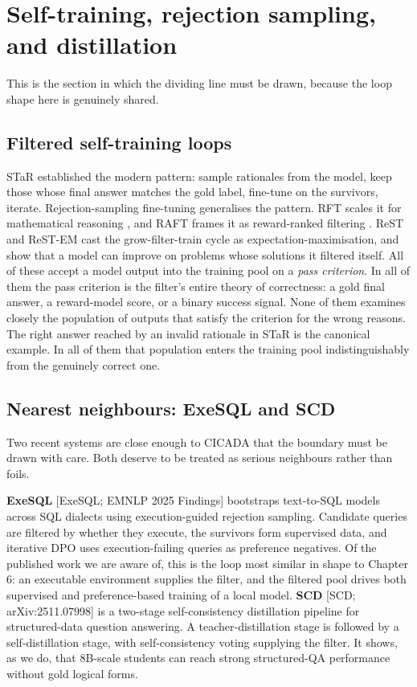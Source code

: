\documentclass[10pt]{article} %
\begin{document}
\section{Self-training, rejection sampling, and distillation}\label{sec:self-training-rejection-sampling-and-dis}

This is the section in which the dividing line must be drawn, because the loop shape here is genuinely shared.

\subsection{Filtered self-training loops}\label{sec:filtered-self-training-loops}

STaR \citep{zelikman2022star} established the modern pattern: sample rationales from the model, keep those whose final answer matches the gold label, fine-tune on the survivors, iterate. Rejection-sampling fine-tuning generalises the pattern. RFT scales it for mathematical reasoning \citep{yuan2023rft}, and RAFT frames it as reward-ranked filtering \citep{dong2023raft}. ReST \citep{gulcehre2023rest} and ReST-EM \citep{singh2024restem} cast the grow-filter-train cycle as expectation-maximisation, and show that a model can improve on problems whose solutions it filtered itself. All of these accept a model output into the training pool on a \emph{pass criterion}. In all of them the pass criterion is the filter's entire theory of correctness: a gold final answer, a reward-model score, or a binary success signal. None of them examines closely the population of outputs that satisfy the criterion for the wrong reasons. The right answer reached by an invalid rationale in STaR is the canonical example. In all of them that population enters the training pool indistinguishably from the genuinely correct one.

\subsection{Nearest neighbours: ExeSQL and SCD}\label{sec:nearest-neighbours-exesql-and-scd}

Two recent systems are close enough to CICADA that the boundary must be drawn with care. Both deserve to be treated as serious neighbours rather than foils.

\textbf{ExeSQL} [ExeSQL; EMNLP 2025 Findings] bootstraps text-to-SQL models across SQL dialects using execution-guided rejection sampling. Candidate queries are filtered by whether they execute, the survivors form supervised data, and iterative DPO uses execution-failing queries as preference negatives. Of the published work we are aware of, this is the loop most similar in shape to Chapter 6: an executable environment supplies the filter, and the filtered pool drives both supervised and preference-based training of a local model. \textbf{SCD} [SCD; arXiv:2511.07998] is a two-stage self-consistency distillation pipeline for structured-data question answering. A teacher-distillation stage is followed by a self-distillation stage, with self-consistency voting supplying the filter. It shows, as we do, that 8B-scale students can reach strong structured-QA performance without gold logical forms.
\end{document}
